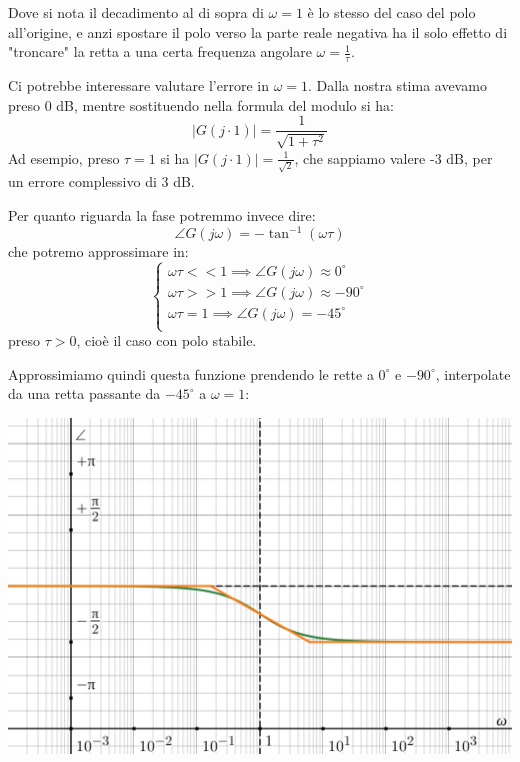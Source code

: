 \documentclass[a4paper,11pt]{article}
\begin{document}
\par\medskip

Dove si nota il decadimento al di sopra di $\omega = 1$ è lo stesso del caso del polo all'origine, e anzi spostare il polo verso la parte reale negativa ha il solo effetto di "troncare" la retta a una certa frequenza angolare $\omega= \frac{1}{\tau}$.

\par\smallskip

Ci potrebbe interessare valutare l'errore in $\omega = 1$.
Dalla nostra stima avevamo preso 0 dB, mentre sostituendo nella formula del modulo si ha:
$$
|G(j \cdot 1)| = \frac{1}{\sqrt{1 + \tau^2}}
$$
Ad esempio, preso $\tau = 1$ si ha $|G(j \cdot 1)| = \frac{1}{\sqrt{2}}$, che sappiamo valere -3 dB, per un errore complessivo di 3 dB.

\par\smallskip

Per quanto riguarda la fase potremmo invece dire:
$$
\angle G(j \omega) = - \tan^{-1} \left( \omega \tau \right)
$$
che potremo approssimare in:
\[
	\begin{cases}
		\omega \tau << 1 \implies \angle G(j\omega) \approx 0^\circ \\ 	
		\omega \tau >> 1 \implies \angle G(j\omega) \approx -90^\circ \\ 	
		\omega \tau = 1 \implies \angle G(j\omega) = -45^\circ \\ 	
	\end{cases}
\]
preso $\tau > 0$, cioè il caso con polo stabile.

\par\medskip

\noindent
\begin{minipage}{\textwidth}
Approssimiamo quindi questa funzione prendendo le rette a $0^\circ$ e $-90^\circ$, interpolate da una retta passante da $-45^\circ$ a $\omega = 1$:
\begin{center}
	\includegraphics[scale=0.3]{../figures/lowpass_bode/phase.png}
\end{center}
\end{minipage}
\end{document}
